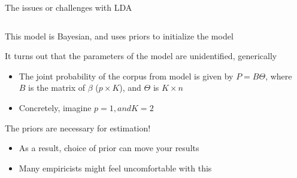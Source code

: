 \documentclass[notes,11pt, aspectratio=169]{beamer}
\newenvironment{wideitemize}{\itemize\addtolength{\itemsep}{10pt}}{\enditemize}
\begin{document}
  \begin{frame}{The issues or challenges with LDA}
    \begin{columns}[onlytextwidth, T] %
      \begin{column}{.5\textwidth}
    \begin{wideitemize}
    \item This model is Bayesian, and uses priors to initialize the model
    \item It turns out that the parameters of the model are
      unidentified, generically
      \begin{itemize}
      \item The joint probability of the corpus from model is given by
        $P = B\Theta$, where $B$ is the matrix of $\beta$
        ($p \times K$), and $\Theta$ is $K \times n$
      \item Concretely, imagine $p = 1, and K = 2$
      \end{itemize}
    \item The priors are necessary for estimation!
      \begin{itemize}
      \item As a result, choice of prior can move your results
      \item Many empiricists might feel uncomfortable with this        
      \end{itemize}
    \end{wideitemize}
      \end{column}%
      \hfill%
      \begin{column}{.5\textwidth}

\end{column}
\end{columns}
\end{frame}
\end{document}
